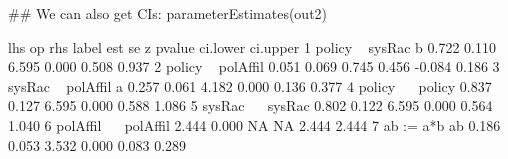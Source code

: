 \begin{Schunk}
\begin{Sinput}
 ## We can also get CIs:
 parameterEstimates(out2)
\end{Sinput}
\begin{Soutput}
       lhs op      rhs label   est    se     z pvalue ci.lower ci.upper
1   policy  ~   sysRac     b 0.722 0.110 6.595  0.000    0.508    0.937
2   policy  ~ polAffil       0.051 0.069 0.745  0.456   -0.084    0.186
3   sysRac  ~ polAffil     a 0.257 0.061 4.182  0.000    0.136    0.377
4   policy ~~   policy       0.837 0.127 6.595  0.000    0.588    1.086
5   sysRac ~~   sysRac       0.802 0.122 6.595  0.000    0.564    1.040
6 polAffil ~~ polAffil       2.444 0.000    NA     NA    2.444    2.444
7       ab :=      a*b    ab 0.186 0.053 3.532  0.000    0.083    0.289
\end{Soutput}
\end{Schunk}
